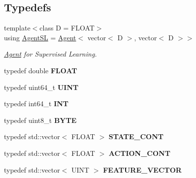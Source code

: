 \subsection*{Typedefs}
\begin{DoxyCompactItemize}
\item 
{\footnotesize template$<$class D  = F\-L\-O\-A\-T$>$ }\\using \hyperlink{namespaceAI_acd3da5a0aa6fc3b0e9988d4a6251bdbd}{Agent\-S\-L} = \hyperlink{classAI_1_1Agent}{Agent}$<$ vector$<$ D $>$, vector$<$ D $>$$>$
\begin{DoxyCompactList}\small\item\em \hyperlink{classAI_1_1Agent}{Agent} for Supervised Learning. \end{DoxyCompactList}\item 
\hypertarget{namespaceAI_a41b74884a20833db653dded3918e05c3}{typedef double {\bfseries F\-L\-O\-A\-T}}\label{namespaceAI_a41b74884a20833db653dded3918e05c3}

\item 
\hypertarget{namespaceAI_ab6e14dc1e659854858a87e511f1439ec}{typedef uint64\-\_\-t {\bfseries U\-I\-N\-T}}\label{namespaceAI_ab6e14dc1e659854858a87e511f1439ec}

\item 
\hypertarget{namespaceAI_ac74584e573f07aa4194b461b1ba7be64}{typedef int64\-\_\-t {\bfseries I\-N\-T}}\label{namespaceAI_ac74584e573f07aa4194b461b1ba7be64}

\item 
\hypertarget{namespaceAI_a9d4bcda82fe0f9aac3c4861e24491581}{typedef uint8\-\_\-t {\bfseries B\-Y\-T\-E}}\label{namespaceAI_a9d4bcda82fe0f9aac3c4861e24491581}

\item 
\hypertarget{namespaceAI_aff63ec21d97dd5f086fddbc3103f5707}{typedef std\-::vector$<$ F\-L\-O\-A\-T $>$ {\bfseries S\-T\-A\-T\-E\-\_\-\-C\-O\-N\-T}}\label{namespaceAI_aff63ec21d97dd5f086fddbc3103f5707}

\item 
\hypertarget{namespaceAI_a143ffd7216e2cf8fc6d92e4efdb647a7}{typedef std\-::vector$<$ F\-L\-O\-A\-T $>$ {\bfseries A\-C\-T\-I\-O\-N\-\_\-\-C\-O\-N\-T}}\label{namespaceAI_a143ffd7216e2cf8fc6d92e4efdb647a7}

\item 
\hypertarget{namespaceAI_a3ff136db55380e4b24a6234c1693f1e9}{typedef std\-::vector$<$ U\-I\-N\-T $>$ {\bfseries F\-E\-A\-T\-U\-R\-E\-\_\-\-V\-E\-C\-T\-O\-R}}\label{namespaceAI_a3ff136db55380e4b24a6234c1693f1e9}

\end{DoxyCompactItemize}
